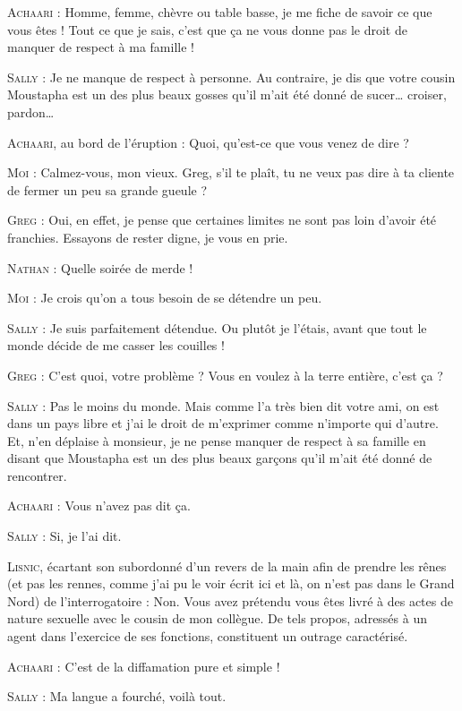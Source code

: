 \begin{dialogue}
\textsc{Achaari} : Homme, femme, chèvre ou table basse, je me fiche de savoir ce que vous êtes ! Tout ce que je sais, c’est que ça ne vous donne pas le droit de manquer de respect à ma famille !

\textsc{Sally} : Je ne manque de respect à personne. Au contraire, je dis que votre cousin Moustapha est un des plus beaux gosses qu’il m’ait été donné de sucer… croiser, pardon…

\textsc{Achaari}, au bord de l’éruption : Quoi, qu’est-ce que vous venez de dire ?

\textsc{Moi} : Calmez-vous, mon vieux. Greg, s’il te plaît, tu ne veux pas dire à ta cliente de fermer un peu sa grande gueule ?

\textsc{Greg} : Oui, en effet, je pense que certaines limites ne sont pas loin d’avoir été franchies. Essayons de rester digne, je vous en prie.

\textsc{Nathan} : Quelle soirée de merde !

\textsc{Moi} : Je crois qu’on a tous besoin de se détendre un peu.

\textsc{Sally} : Je suis parfaitement détendue. Ou plutôt je l’étais, avant que tout le monde décide de me casser les couilles !

\textsc{Greg} : C’est quoi, votre problème ? Vous en voulez à la terre entière, c’est ça ?

\textsc{Sally} : Pas le moins du monde. Mais comme l’a très bien dit votre ami, on est dans un pays libre et j’ai le droit de m’exprimer comme n’importe qui d’autre. Et, n’en déplaise à monsieur, je ne pense manquer de respect à sa famille en disant que Moustapha est un des plus beaux garçons qu’il m’ait été donné de rencontrer.

\textsc{Achaari} : Vous n’avez pas dit ça.

\textsc{Sally} : Si, je l’ai dit.

\textsc{Lisnic}, écartant son subordonné d’un revers de la main afin de prendre les rênes (et pas les rennes, comme j’ai pu le voir écrit ici et là, on n’est pas dans le Grand Nord) de l’interrogatoire : Non. Vous avez prétendu vous êtes livré à des actes de nature sexuelle avec le cousin de mon collègue. De tels propos, adressés à un agent dans l’exercice de ses fonctions, constituent un outrage caractérisé.

\textsc{Achaari} : C’est de la diffamation pure et simple !

\textsc{Sally} : Ma langue a fourché, voilà tout.


\end{dialogue}
